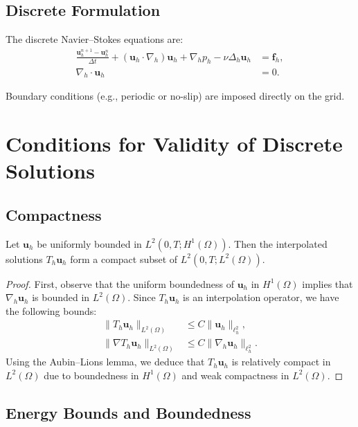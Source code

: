 \subsection{Discrete Formulation}

The discrete Navier--Stokes equations are:
\begin{align}
\frac{\mathbf{u}_h^{n+1} - \mathbf{u}_h^n}{\Delta t} + (\mathbf{u}_h \cdot \nabla_h) \mathbf{u}_h + \nabla_h p_h - \nu \Delta_h \mathbf{u}_h &= \mathbf{f}_h, \label{eq:discrete-momentum} \\
\nabla_h \cdot \mathbf{u}_h &= 0. \label{eq:discrete-incompressibility}
\end{align}

Boundary conditions (e.g., periodic or no-slip) are imposed directly on the grid.

\section{Conditions for Validity of Discrete Solutions}

\subsection{Compactness}

\begin{theorem}[Compactness]
Let $\mathbf{u}_h$ be uniformly bounded in $L^2(0,T; H^1(\Omega))$. Then the interpolated solutions $T_h \mathbf{u}_h$ form a compact subset of $L^2(0,T; L^2(\Omega))$.
\end{theorem}

\begin{proof}
First, observe that the uniform boundedness of $\mathbf{u}_h$ in $H^1(\Omega)$ implies that $\nabla_h \mathbf{u}_h$ is bounded in $L^2(\Omega)$. Since $T_h \mathbf{u}_h$ is an interpolation operator, we have the following bounds:
\begin{align*}
\|T_h \mathbf{u}_h\|_{L^2(\Omega)} &\leq C \|\mathbf{u}_h\|_{\ell^2_h}, \\
\|\nabla T_h \mathbf{u}_h\|_{L^2(\Omega)} &\leq C \|\nabla_h \mathbf{u}_h\|_{\ell^2_h}.
\end{align*}
Using the Aubin--Lions lemma, we deduce that $T_h \mathbf{u}_h$ is relatively compact in $L^2(\Omega)$ due to boundedness in $H^1(\Omega)$ and weak compactness in $L^2(\Omega)$.
\end{proof}

\subsection{Energy Bounds and Boundedness}

